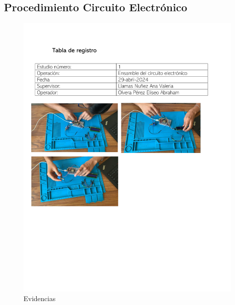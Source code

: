 \subsection{Procedimiento Circuito Electrónico}
    \begin{figure}[H]
        \centering
        \includegraphics[trim = {12mm 60mm 12mm 40mm},clip,scale=0.5]{16/Img/tablaDeRegistro.pdf}
        \caption{Evidencias}
        \label{fig:Evidencias}
    \end{figure}
